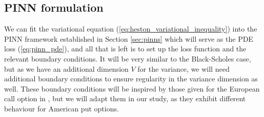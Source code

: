 \subsection{PINN formulation}

We can fit the variational equation (\ref{eq:heston_variational_inequality}) into the PINN framework established in Section \ref{sec:pinns} which will serve as the PDE loss (\ref{eq:pinn_pde}), and all that is left is to set up the loss function and the relevant boundary conditions. It will be very similar to the Black-Scholes case, but as we have an additional dimension $V$ for the variance, we will need additional boundary conditions to ensure regularity in the variance dimension as well. These boundary conditions will be inspired by those given for the European call option in \cite{heston1993closed}, but we will adapt them in our study, as they exhibit different behaviour for American put options.

